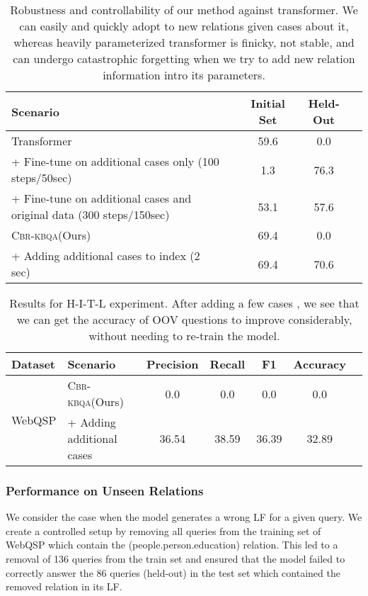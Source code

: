 \documentclass{article}
\newcommand{\hitl}{\textsc{H-I-T-L}\xspace}
\newcommand{\alg}{\textsc{Cbr-kbqa}\xspace}
\begin{document}
\begin{table*}
    \centering
    \begin{tabular}{l c c c c}
    \toprule
    Scenario && Initial Set & Held-Out \\
    \midrule
    Transformer     && 59.6 & 0.0 & \\
    \quad + Fine-tune on additional cases only (100 steps/50sec) && 1.3 & 76.3 \\
    \quad + Fine-tune on additional cases and original data (300 steps/150sec) && 53.1 & 57.6 \\
    \midrule
    \alg (Ours) && 69.4 & 0.0 \\
    \quad + Adding additional cases to index (2 sec) && 69.4 & 70.6 \\
    \bottomrule
    \end{tabular}
    \caption{Robustness and controllability of our method against transformer. We can easily and quickly adopt to new relations given cases about it, whereas heavily parameterized transformer is finicky, not stable, and can undergo catastrophic forgetting when we try to add new relation information intro its parameters.}
    \label{tab:robust}
\end{table*}

\begin{table*}
    \centering
    \begin{tabular}{l l c c c c c c}
    \toprule
    Dataset & Scenario && Precision & Recall & F1 & Accuracy \\
    \midrule
    \multirow{2}{*}{WebQSP}& \alg (Ours) && 0.0 & 0.0 & 0.0 & 0.0 \\
    & \quad + Adding additional cases &&  36.54 & 38.59 & 36.39 & 32.89 \\
    \bottomrule
    \end{tabular}
    \caption{Results for \hitl experiment. After adding a few cases , we see that we can get the accuracy of OOV questions to improve considerably, without needing to re-train the model.}
    \label{tab:hitl_results_appendix}
\end{table*}


\subsubsection{Performance on Unseen Relations}
\label{subsub:unseen_rel}
We consider the case when the model generates a wrong LF for a given query. We create a controlled setup by removing all queries from the training set of WebQSP which contain the (people.person.education) relation. This led to a removal of 136 queries from the train set and ensured that the model failed to correctly answer the 86 queries (held-out) in the test set which contained the removed relation in its LF.
\end{document}
